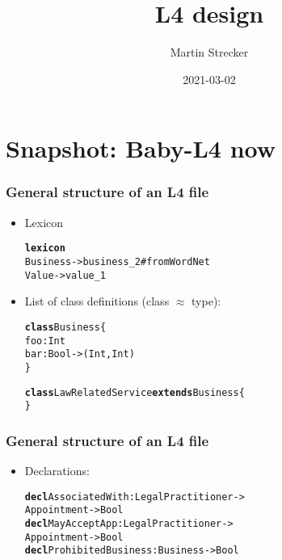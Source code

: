 \documentclass{beamer}
\title{L4 design}
\author{Martin Strecker}
\date{2021-03-02}
\begin{document}

\begin{frame}
  \titlepage
\end{frame}



\section{Snapshot: Baby-L4 now}

\begin{frame}[fragile]\frametitle{General structure of an L4 file}

  \begin{itemize}
  \item Lexicon
\begin{alltt}
\textbf{lexicon}
Business -> business_2 #from WordNet
Value -> value_1 
\end{alltt}
    
  \item List of class definitions (class $\approx$ type):
\begin{alltt}
\textbf{class} Business \{
      foo: Int
      bar: Bool -> (Int,Int)
\}

\textbf{class} LawRelatedService \textbf{extends} Business \{
\}
\end{alltt}

    
  \end{itemize}

\end{frame}


\begin{frame}[fragile]\frametitle{General structure of an L4 file}

  \begin{itemize}
  \item Declarations:
\begin{alltt}
\textbf{decl} AssociatedWith: LegalPractitioner -> 
                      Appointment -> Bool
\textbf{decl} MayAcceptApp : LegalPractitioner -> 
                      Appointment -> Bool
\textbf{decl} ProhibitedBusiness : Business -> Bool
\end{alltt}
    
  \end{itemize}

\end{frame}
\end{document}
